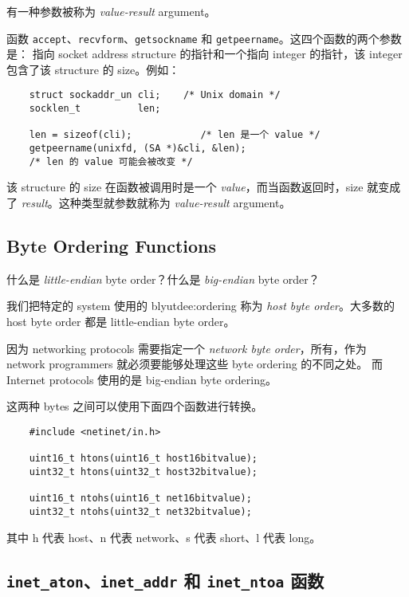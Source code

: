     有一种参数被称为 \textit{value-result} argument。
    
    函数 \texttt{accept}、\texttt{recvform}、\texttt{getsockname} 和 \texttt{getpeername}。这四个函数的两个参数是：
    指向 socket address structure 的指针和一个指向 integer 的指针，该 integer 包含了该 structure 的 size。例如：

    \begin{verbatim}
    struct sockaddr_un cli;    /* Unix domain */
    socklen_t          len;

    len = sizeof(cli);            /* len 是一个 value */
    getpeername(unixfd, (SA *)&cli, &len);
    /* len 的 value 可能会被改变 */
    \end{verbatim}

    该 structure 的 size 在函数被调用时是一个 \textit{value}，而当函数返回时，size 就变成了 \textit{result}。这种类型就参数就称为 \textit{value-result} argument。

  \subsection{Byte Ordering Functions}


    什么是 \textit{little-endian} byte order？什么是 \textit{big-endian} byte order？

    我们把特定的 system 使用的 blyutdee:ordering 称为 \textit{host byte order}。大多数的 host byte order 都是 little-endian byte order。

    因为 networking protocols 需要指定一个 \textit{network byte order}，所有，作为 network programmers 就必须要能够处理这些 byte ordering 的不同之处。
    而 Internet protocols 使用的是 big-endian byte ordering。

    这两种 bytes 之间可以使用下面四个函数进行转换。

    \begin{verbatim}
    #include <netinet/in.h>

    uint16_t htons(uint16_t host16bitvalue);
    uint32_t htons(uint32_t host32bitvalue);

    uint16_t ntohs(uint16_t net16bitvalue);
    uint32_t ntohs(uint32_t net32bitvalue);
    \end{verbatim}

    其中 h 代表 host、n 代表 network、s 代表 short、l 代表 long。

  \subsection{\texttt{inet\_aton}、\texttt{inet\_addr} 和 \texttt{inet\_ntoa} 函数}

